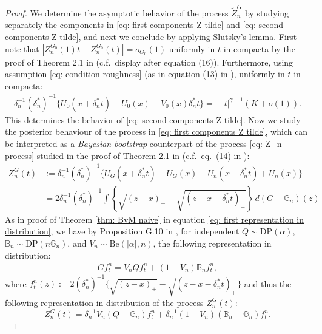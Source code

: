 \begin{proof}
We determine the asymptotic behavior of the process $\tilde{Z}^{\scriptscriptstyle{G}}_n$ by studying separately the components in \eqref{eq: first components Z tilde} and \eqref{eq: second components Z tilde}, and next we conclude by applying Slutsky's lemma. First note that $|Z^{\scriptscriptstyle{G_0}}_n(1)t - Z^{\scriptscriptstyle{G_0}}_n(t)| = o_{\scriptscriptstyle{G_0}}(1)$ uniformly in $t$ in compacta by the proof of Theorem 2.1 in \cite{27} (c.f.\ display after equation (16)). Furthermore, using assumption \eqref{eq: condition roughness} (as in equation (13) in \cite{27}), uniformly in $t$ in compacta:
\begin{align}\label{eq: deterministic part process}
	\delta_n^{-1} \left( \delta_n^* \right)^{-1} \big\{ U_0 \left( x + \delta_n^* t \right) - U_0(x) - V_0(x) \delta^*_n t \big\} =  - |t|^{\gamma+ 1} (K + o(1)).
\end{align}
This determines the behavior of \eqref{eq: second components Z tilde}. Now we study the posterior behaviour of the process in \eqref{eq: first components Z tilde}, which can be interpreted as a \textit{Bayesian bootstrap} counterpart of the process \eqref{eq: Z_n process} studied in the proof of Theorem 2.1 in \cite{27} (c.f.\ eq.\ (14) in \cite{27}):
\begin{align*}
	Z^{\scriptscriptstyle{G}}_n(t) &:= \delta_n^{-1} \left( \delta_n^* \right)^{-1} \big\{ U_{\scriptscriptstyle{G}} \left( x + \delta_n^* t \right) - U_{\scriptscriptstyle{G}}(x) - U_n \left( x + \delta_n^* t \right) + U_n(x) \big\} \\
	&= 2 \delta_n^{-1} \left( \delta_n^* \right)^{-1} \int\left\{\sqrt{(z-x)_+} -\sqrt{(z-x-\delta^*_n t)_+} \right\} \, d\left(G-\mathbb{G}_n\right)(z)
\end{align*}
As in proof of Theorem \ref{thm: BvM naive} in equation \eqref{eq: first representation in distribution}, we have by Proposition G.10 in \cite{4}, for independent \( Q \sim \text{DP}(\alpha) \), \( \mathbb{B}_n \sim \text{DP}(n \mathbb{G}_n) \), and \( V_n \sim \text{Be}(|\alpha|, n) \), the following representation in distribution:
\begin{align}\label{eq: representation process G}
	G f_t^n = V_n Q f_t^n + (1 - V_n) \mathbb{B}_n f_t^n,
\end{align}
where $f_t^n(z) := 2(\delta_n^*)^{-1} \big\{ \sqrt{(z-x)_+} -\sqrt{(z-x-\delta^*_n t)_+}  \big\}$ and thus the following representation in distribution of the process \( Z^{\scriptscriptstyle{G}}_n(t) \):
\[
Z^{\scriptscriptstyle{G}}_n(t) = \delta_n^{-1} V_n (Q - \mathbb{G}_n) f_t^n + \delta_n^{-1} (1 - V_n) (\mathbb{B}_n - \mathbb{G}_n) f_t^n.
\]
\end{proof}
